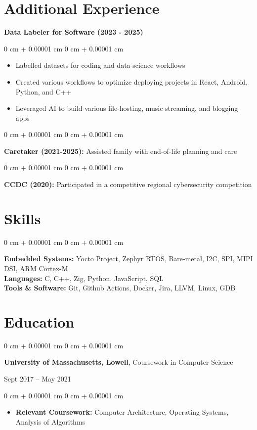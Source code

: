 \documentclass[10pt, letterpaper]{article}
\newenvironment{onecolentry}{
    \begin{adjustwidth}{
        0 cm + 0.00001 cm
    }{
        0 cm + 0.00001 cm
    }
}{
    \end{adjustwidth}
} %
\newenvironment{twocolentry}[2][]{
    \onecolentry
    \def\secondColumn{#2}
    \setcolumnwidth{\fill, 6.0 cm}
    \begin{paracol}{2}
}{
    \switchcolumn \raggedleft \secondColumn
    \end{paracol}
    \endonecolentry
} %
\begin{document}
    \section{Additional Experience}
      \textbf{Data Labeler for Software (2023 - 2025)}

        \vspace{0.10 cm}
        \begin{onecolentry}
          \begin{itemize}
                \item Labelled datasets for coding and data-science workflows
                \item Created various workflows to optimize deploying projects in React, Android, Python, and C++
                \item Leveraged AI to build various file-hosting, music streaming, and blogging apps
              \end{itemize}
        \end{onecolentry}

        \vspace{0.2 cm}

        \begin{onecolentry}
            \textbf{Caretaker (2021-2025):} Assisted family with end-of-life planning and care
          \end{onecolentry}
        
        \vspace{0.2 cm}

        \begin{onecolentry}
            \textbf{CCDC (2020):} Participated in a competitive regional cybersecurity competition
          \end{onecolentry}

    \section{Skills}
        \begin{onecolentry}
            \textbf{Embedded Systems:} Yocto Project, Zephyr RTOS, Bare-metal, I2C, SPI, MIPI DSI, ARM Cortex-M \\
            \textbf{Languages:} C, C++, Zig, Python, JavaScript, SQL \\
            \textbf{Tools \& Software:} Git, Github Actions, Docker, Jira, LLVM, Linux, GDB
        \end{onecolentry}

    \section{Education}
        \begin{twocolentry}{
            Sept 2017 – May 2021
        }
            \textbf{University of Massachusetts, Lowell}, Coursework in Computer Science
        \end{twocolentry}

        \vspace{0.10 cm}
        \begin{onecolentry}
          \begin{itemize}
                \item \textbf{Relevant Coursework:} Computer Architecture, Operating Systems, Analysis of Algorithms
              \end{itemize}
        \end{onecolentry}
\end{document}
